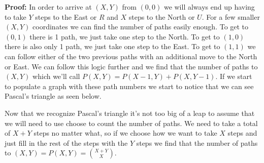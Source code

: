 \documentclass[10pt, AMS Euler]{article}
\begin{document}
	\noindent \textbf{Proof:} In order to arrive at $(X,Y)$ from $(0,0)$ we will always end up having to take $Y$ steps to the East or $R$ and $X$ steps to the North or $U$. For a few smaller $(X,Y)$ coordinates we can find the number of paths easily enough. To get to $(0,1)$ there is 1 path, we just take one step to the North. To get to $(1,0)$ there is also only 1 path, we just take one step to the East. To get to $(1,1)$ we can follow either of the two previous paths with an additional move to the North or East. We can follow this logic further and we find that the number of paths to $(X,Y)$ which we'll call $P(X,Y)=P(X-1,Y)+P(X,Y-1)$. If we start to populate a graph with these path numbers we start to notice that we can see Pascal's triangle as seen below.\\
    \begin{center}
    \end{center}
    Now that we recognize Pascal's triangle it's not too big of a leap to assume that we will need to use choose to count the number of paths. We need to take a total of $X+Y$ steps no matter what, so if we choose how we want to take $X$ steps and just fill in the rest of the steps with the $Y$ steps we find that the number of paths to $\boxed{(X,Y)=P(X,Y)=\binom{X+Y}{X}}$.
    
\end{document}
